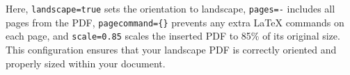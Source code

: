 		Here, \lstinline|landscape=true| sets the orientation to landscape, \lstinline|pages=-| includes all pages from the PDF, \lstinline|pagecommand={}| prevents any extra LaTeX commands on each page, and \lstinline|scale=0.85| scales the inserted PDF to 85\% of its original size. 
		This configuration ensures that your landscape PDF is correctly oriented and properly sized within your document.
		
		